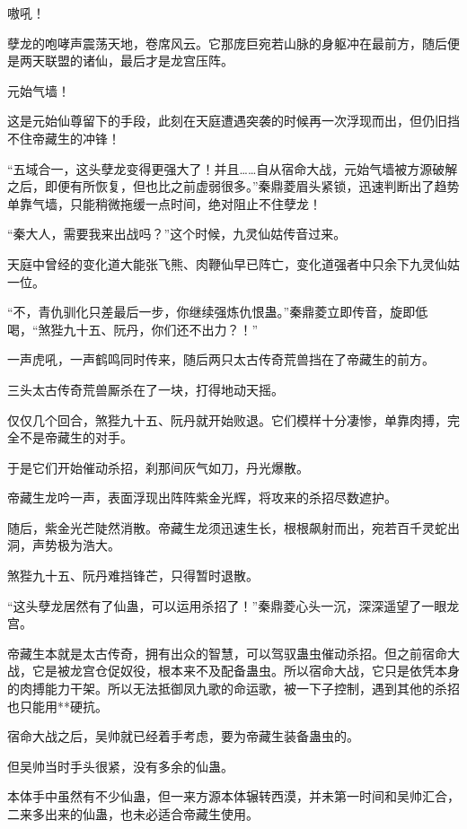 
\begin{this_body}

嗷吼！

孽龙的咆哮声震荡天地，卷席风云。它那庞巨宛若山脉的身躯冲在最前方，随后便是两天联盟的诸仙，最后才是龙宫压阵。

元始气墙！

这是元始仙尊留下的手段，此刻在天庭遭遇突袭的时候再一次浮现而出，但仍旧挡不住帝藏生的冲锋！

“五域合一，这头孽龙变得更强大了！并且……自从宿命大战，元始气墙被方源破解之后，即便有所恢复，但也比之前虚弱很多。”秦鼎菱眉头紧锁，迅速判断出了趋势单靠气墙，只能稍微拖缓一点时间，绝对阻止不住孽龙！

“秦大人，需要我来出战吗？”这个时候，九灵仙姑传音过来。

天庭中曾经的变化道大能张飞熊、肉鞭仙早已阵亡，变化道强者中只余下九灵仙姑一位。

“不，青仇驯化只差最后一步，你继续强炼仇恨蛊。”秦鼎菱立即传音，旋即低喝，“煞狴九十五、阮丹，你们还不出力？！”

一声虎吼，一声鹤鸣同时传来，随后两只太古传奇荒兽挡在了帝藏生的前方。

三头太古传奇荒兽厮杀在了一块，打得地动天摇。

仅仅几个回合，煞狴九十五、阮丹就开始败退。它们模样十分凄惨，单靠肉搏，完全不是帝藏生的对手。

于是它们开始催动杀招，刹那间灰气如刀，丹光爆散。

帝藏生龙吟一声，表面浮现出阵阵紫金光辉，将攻来的杀招尽数遮护。

随后，紫金光芒陡然消散。帝藏生龙须迅速生长，根根飙射而出，宛若百千灵蛇出洞，声势极为浩大。

煞狴九十五、阮丹难挡锋芒，只得暂时退散。

“这头孽龙居然有了仙蛊，可以运用杀招了！”秦鼎菱心头一沉，深深遥望了一眼龙宫。

帝藏生本就是太古传奇，拥有出众的智慧，可以驾驭蛊虫催动杀招。但之前宿命大战，它是被龙宫仓促奴役，根本来不及配备蛊虫。所以宿命大战，它只是依凭本身的肉搏能力干架。所以无法抵御凤九歌的命运歌，被一下子控制，遇到其他的杀招也只能用**硬抗。

宿命大战之后，吴帅就已经着手考虑，要为帝藏生装备蛊虫的。

但吴帅当时手头很紧，没有多余的仙蛊。

本体手中虽然有不少仙蛊，但一来方源本体辗转西漠，并未第一时间和吴帅汇合，二来多出来的仙蛊，也未必适合帝藏生使用。


\end{this_body}

